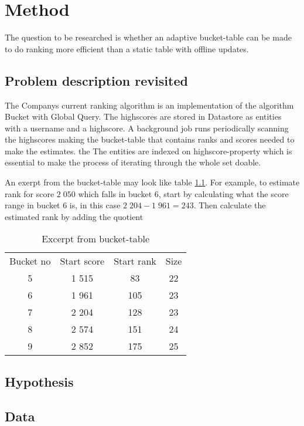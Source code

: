 \chapter{Method}

The question to be researched is whether an adaptive bucket-table can be made to do ranking more efficient than a static table with offline updates.

\section{Problem description revisited}


The Companys current ranking algorithm is an implementation of the algorithm Bucket with Global Query. The highscores are stored in Datastore as entities with a username and a highscore. A background job runs periodically scanning the highscores making the bucket-table that contains ranks and scores needed to make the estimates. the The entities are indexed on highscore-property which is essential to make the process of iterating through the whole set doable.

An exerpt from the bucket-table may look like table \ref{table:ranking-table}. For example, to estimate rank for score $2\;050$ which falls in bucket 6, start by calculating what the score range in bucket 6 is, in this case $2\;204 - 1\;961 = 243$. Then calculate the estimated rank by adding the quotient 

\begin{table}
  \begin{center}
  \begin{tabular}{ c c c c }
  Bucket no & Start score & Start rank & Size \\
  5 & 1 515 & 83 & 22 \\ 
  6 & 1 961 & 105 & 23 \\ 
  7 & 2 204 & 128 & 23 \\ 
  8 & 2 574 & 151 & 24 \\  
  9 & 2 852 & 175 & 25 \\ 
\end{tabular}
\caption{Excerpt from bucket-table}
\label{table:ranking-table}
\end{center}
\end{table}

\section{Hypothesis} 
  

\section{Data}

